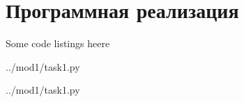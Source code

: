 \section{Программная реализация}

Some code listings heere


{ ../mod1/task1.py }



{ ../mod1/task1.py }
